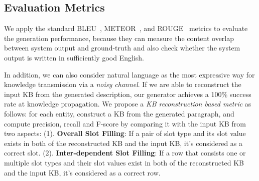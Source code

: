 \documentclass[11pt,a4paper]{article}
\begin{document}
 \subsection{Evaluation Metrics}

We apply the standard BLEU~\citep{Bleu02}, METEOR~\cite{denkowski2014meteor}, and ROUGE~\citep{lin2004rouge} metrics to evaluate the generation performance, because they can measure the content overlap between system output and ground-truth and also check whether the system output is written in sufficiently good English.

In addition, we 
can also consider natural language as the most expressive way for knowledge transmission via a \emph{noisy channel}. 
If we are able to reconstruct the input KB from the generated description, our generator achieves a 100\% success rate at knowledge propagation. We propose a \emph{KB reconstruction based metric} as follows: for each entity, construct a KB from the generated paragraph, and compute precision, recall and F-score by comparing it with the input KB from two aspects: 
(1). \textbf{Overall Slot Filling}: If a pair of slot type and its slot value exists in both of the reconstructed KB and the input KB, it's considered as a correct slot. 
(2). \textbf{Inter-dependent Slot Filling}: If a row that consists one or multiple slot types and their slot values exist in both of the reconstructed KB and the input KB, it's considered as a correct row. 
\end{document}
